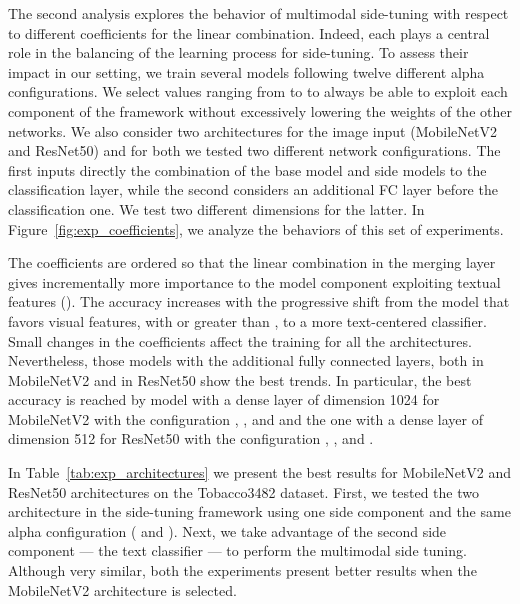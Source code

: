 The second analysis explores the behavior of multimodal side-tuning with respect to different coefficients for the linear combination.
Indeed, each  plays a central role in the balancing of the learning process for side-tuning.
To assess their impact in our setting, we train several models following twelve different alpha configurations.
We select values ranging from  to  to always be able to exploit each component of the framework without excessively lowering the weights of the other networks.
We also consider two architectures for the image input (MobileNetV2 and ResNet50) and for both we tested two different network configurations.
The first inputs directly the combination of the base model and side models to the classification layer, while the second considers an additional FC layer before the classification one.
We test two different dimensions for the latter.
In Figure~\ref{fig:exp_coefficients}, we analyze the behaviors of this set of experiments.

The coefficients are ordered so that the linear combination in the merging layer gives incrementally more importance to the model component exploiting textual features ().
The accuracy increases with the progressive shift from the model that favors visual features, with  or  greater than , to a more text-centered classifier.
Small changes in the coefficients affect the training for all the architectures.
Nevertheless, those models with the additional fully connected layers, both in MobileNetV2 and in ResNet50 show the best trends. 
In particular, the best accuracy is reached by model with a dense layer of dimension 1024 for MobileNetV2 with the configuration ,  , and   and the one with a dense layer of dimension 512 for ResNet50 with the configuration ,  , and  .


In Table~\ref{tab:exp_architectures} we present the best results for MobileNetV2 and ResNet50 architectures on the Tobacco3482 dataset.
First, we tested the two architecture in the side-tuning framework using one side component and the same alpha configuration ( and  ).
Next, we take advantage of the second side component --- the text classifier --- to perform the multimodal side tuning.
Although very similar, both the experiments present better results when the MobileNetV2 architecture is selected.

